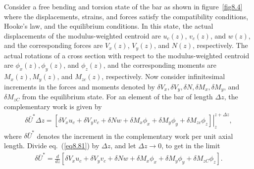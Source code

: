 \documentclass{AeroStructure-ERJohnson}
\begin{document}
Consider a free bending and torsion state of the bar as shown in
figure~\ref{fig8.4} where the displacements, strains, and forces satisfy
the compatibility conditions, Hooke's law, and the equilibrium
conditions. In this state, the actual displacements of the
modulus-weighted centroid are $u_{c}(z)$, $v_{c}(z)$, and $w(z)$,
and the corresponding forces are $V_{x}(z)$, $V_{y}(z)$, and
$N(z)$, respectively. The actual rotations of a cross section with
respect to the modulus-weighted centroid are $\phi_{x}(z),
\phi_{y}(z)$, and $\phi_{z}(z)$, and the corresponding moments are
$M_{x}(z), M_{y}(z)$, and $M_{z c}(z)$, respectively. Now consider
infinitesimal increments in the forces and moments denoted by
$\delta V_{x}, \delta V_{y}, \delta N, \delta M_{x},\delta M_{y}$,
and $\delta M_{z C}$ from the equilibrium state. For an element of
the bar of length $\Delta z$, the complementary work is given by
\begin{align}\label{eq8.81}
\delta \bar{U}^{*} \Delta z=\left.\left[\delta V_{x} u_{c}+\delta
V_{y} v_{c}+\delta N w+\delta M_{x} \phi_{x}+\delta M_{y}
\phi_{y}+\delta M_{z c} \phi_{z}\right]\right|_{z} ^{z+\Delta z},
\end{align}
where $\delta \bar{U}^{*}$ denotes the increment in the
complementary work per unit axial length. Divide
eq.~(\ref{eq8.81}) by $\Delta z$, and let $\Delta z \rightarrow
0$, to get in the limit
\begin{align}\label{eq8.82}
\delta \bar{U}^{*}=\frac{d}{d z}\left[\delta V_{x} u_{c}+\delta
V_{y} v_{c}+\delta N w+\delta M_{x} \phi_{x}+\delta M_{y}
\phi_{y}+\delta M_{z C} \phi_{z}\right].
\end{align}
\vspace*{2pt}\vspace*{-10pt}
\clearpage
\end{document}
